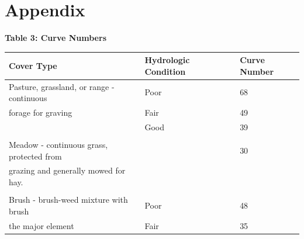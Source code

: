 \documentclass{article}
\begin{document}
\section{Appendix}
\begin{center}
{\large{\bf Table 3: Curve Numbers\\}}
\vspace{3mm}
\begin{tabular}{|l|lll|} 
    \hline
    \textbf{Cover Type}     & \textbf{Hydrologic Condition} &  & \textbf{Curve Number}                  \\
    \hline
    Pasture, grassland, or range - continuous & Poor                 &  & 68                                                         \\ 

    forage for graving                        & Fair                 &  & 49                                                          \\ 

                                              & Good                 &  & 39                                                           \\ 

                                              &                      &  &                                                               \\ 

    Meadow - continuous grass, protected from &                      &  & 30                                                            \\ 

    grazing and generally mowed for hay.      &                      &  &                                                               \\ 

                                              &                      &  &                                                               \\ 

    Brush - brush-weed mixture with brush     & Poor                 &  & 48                                                            \\ 

    the major element                         & Fair                 &  & 35                                                            \\ 


\end{tabular}
\end{center}
\end{document}
